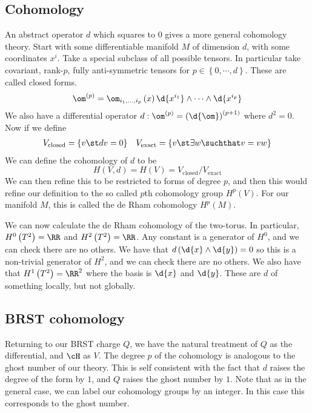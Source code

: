 \documentclass{booc}
\begin{document}
\subsection{Cohomology}

An abstract operator $d$ which squares to $0$ gives a more general cohomology theory.
Start with some differentiable manifold $M$ of dimension $d$, with some coordinates $x^i$.
Take a special subclass of all possible tensors. 
In particular take covariant, rank-$p$, fully anti-symmetric tensors
for $p\in \left\{ 0 , \cdots , d \right\}$.
These are called closed forms.
\begin{equation}
\om^{\left( p \right)} = \om_{i_1 , \ldots , i_p}\left( x \right)
\d{x^{i_1}} \wedge \cdots \wedge \d{x^{i_p}}
\end{equation}
We also have a differential operator
$d: \om^{\left( p \right)} = \left( \d{\om} \right)^{\left( p+1 \right)}$
where $d^2 = 0$.
Now if we define
\begin{align}
V_{\text{closed}} = \left\{ v \st dv = 0 \right\}
&&
V_{\text{exact}} = \left\{ v\st \exists w \suchthat  v = vw \right\}
\end{align}
We can define the cohomology of $d$ to be
\begin{equation}
H\left( V , d \right) = H\left( V \right) = V_{\text{closed}} / V_{\text{exact}}
\end{equation}
We can then refine this to be restricted to forms of degree $p$, 
and then this would refine our definition to the so called $p$th cohomology group
$H^p\left( V \right)$. 
For our manifold $M$, this is called the de Rham cohomology $H^p\left( M \right)$. 

\begin{exm}
We can now calculate the de Rham cohomology of 
the two-torus. 
In particular, $H^0\left( T^2 \right) = \RR$
and $H^2\left( T^2 \right) = \RR$.
Any constant is a generator of $H^0$, and we can check there are no others.
We have that $d\left( \d{x} \wedge \d{y} \right) = 0$
so this is a non-trivial generator of $H^2$, and we can check there
are no others.
We also have that $H^1\left( T^2 \right) = \RR^2$
where the basis is $\d{x}$ and $\d{y}$.
These are $d$ of something locally, but not globally.
\end{exm}

\subsection{BRST cohomology}

Returning to our BRST charge $Q$, we have the natural treatment of $Q$ as the differential, 
and $\cH$ as $V$. The degree $p$ of the cohomology is analogous to the
ghost number of our theory.
This is self consistent with the fact that $d$ raises the degree of the form by $1$, 
and $Q$ raises the ghost number by $1$.
Note that as in the general case, we can label our cohomology
groups by an integer. In this case this corresponds to the ghost number.
\end{document}
